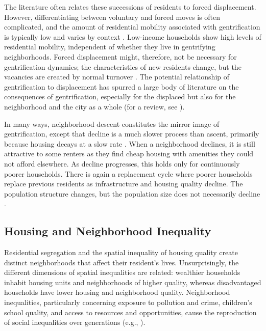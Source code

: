 The literature often relates these successions of residents to forced displacement. However, differentiating between voluntary and forced moves is often complicated, and the amount of residential mobility associated with gentrification is typically low and varies by context \citep{freemanDisplacementSuccessionResidential2005, dingGentrificationResidentialMobility2016, leeGeographyGentrificationResidential2023}. Low-income households show high levels of residential mobility, independent of whether they live in gentrifying neighborhoods. Forced displacement might, therefore, not be necessary for gentrification dynamics; the characteristics of new residents change, but the vacancies are created by normal turnover \citep{freemanDisplacementSuccessionResidential2005}. The potential relationship of gentrification to displacement has spurred a large body of literature on the consequences of gentrification, especially for the displaced but also for the neighborhood and the city as a whole (for a review, see \cite{atkinsonEvidenceImpactGentrification2004}). 

In many ways, neighborhood descent constitutes the mirror image of gentrification, except that decline is a much slower process than ascent, primarily because housing decays at a slow rate \citep{glaeserUrbanDeclineDurable2005}. When a neighborhood declines, it is still attractive to some renters as they find cheap housing with amenities they could not afford elsewhere. As decline progresses, this holds only for continuously poorer households. There is again a replacement cycle where poorer households replace previous residents as infrastructure and housing quality decline. The population structure changes, but the population size does not necessarily decline \citep{guerrieriWithinCityVariationUrban2012}.


\subsection{Housing and Neighborhood Inequality}

Residential segregation and the spatial inequality of housing quality create distinct neighborhoods that affect their resident's lives. Unsurprisingly, the different dimensions of spatial inequalities are related: wealthier households inhabit housing units and neighborhoods of higher quality, whereas disadvantaged households have lower housing and neighborhood quality. Neighborhood inequalities, particularly concerning exposure to pollution and crime, children's school quality, and access to resources and opportunities, cause the reproduction of social inequalities over generations (e.g., \cite{masseyAmericanApartheidSegregation1993, sharkeyIntergenerationalTransmissionContext2008, chettyImpactsNeighborhoodsIntergenerational2018a}).

